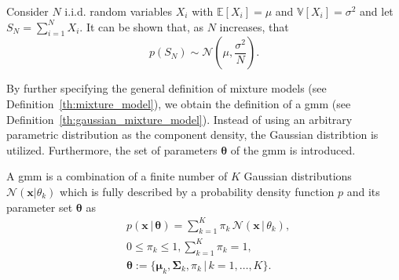 \documentclass[../../../main.tex]{subfiles}
\begin{document}
\begin{theorem}\label{th:central_limit} \cite[p.241]{montgomery_2010}
Consider $N$ i.i.d. random variables $X_i$ with $\mathbb{E}[X_i]=\mu$ and $\mathbb{V}[X_i]=\sigma^2$ and let $S_N=\sum^N_{i=1}X_i$. It can be shown that, as $N$ increases, that
\begin{equation*}
    p(S_N) \sim \mathcal{N}\left(\mu, \frac{\sigma^2}{N}\right).
\end{equation*}
\end{theorem}

By further specifying the general definition of mixture models (see Definition~\ref{th:mixture_model}), we obtain the definition of a \gls{gmm} (see Definition~\ref{th:gaussian_mixture_model}). Instead of using an arbitrary parametric distribution as the component density, the Gaussian distribtion is utilized. Furthermore, the set of parameters $\bm{\theta}$ of the \gls{gmm} is introduced.

\begin{definition}\label{def:gmm} \cite[p. 315]{dei_2020}\label{th:gaussian_mixture_model}
A \acrlong{gmm} is a combination of a finite number of $K$ Gaussian distributions $\mathcal{N}(\bm{x}|\theta_k)$ which is fully described by a probability density function $p$ and its parameter set $\bm{\theta}$ as
\begin{equation}\label{eq:gmm_def}
    \begin{aligned}
        &p(\bm{x} \, | \, \bm{\theta}) = \sum\limits_{k=1}^K \pi_k \, \mathcal{N}(\bm{x} \, | \, \theta_k), \\
        &0 \leq \pi_k \leq 1, \sum\limits_{k=1}^K \pi_k = 1, \\
        &\bm{\theta} := \{\bm{\mu}_k, \bm{\Sigma}_k, \pi_k \, | \, k = 1, \dots, K \}.
    \end{aligned}
\end{equation}
\end{definition}
\end{document}
